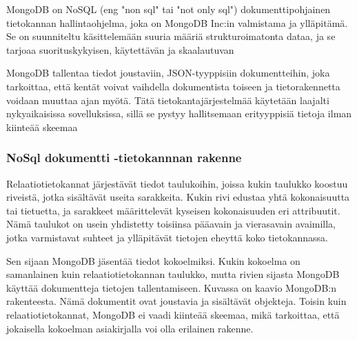 












MongoDB on NoSQL (eng "non sql"{} tai "not only sql"{}) dokumenttipohjainen tietokannan hallintaohjelma,
joka on MongoDB Inc:in valmistama ja ylläpitämä.
Se on suunniteltu käsittelemään suuria määriä strukturoimatonta dataa,
ja se tarjoaa suorituskykyisen, käytettävän ja skaalautuvan
\medskip




MongoDB tallentaa tiedot joustaviin, JSON-tyyppisiin dokumentteihin, 
joka tarkoittaa, että kentät voivat vaihdella dokumentista toiseen ja tietorakennetta voidaan muuttaa ajan myötä. 
Tätä tietokantajärjestelmää käytetään laajalti nykyaikaisissa sovelluksissa, 
sillä se pystyy hallitsemaan erityyppisiä tietoja ilman kiinteää skeemaa
\medskip



\subsubsection{NoSql dokumentti -tietokannnan rakenne}




Relaatiotietokannat järjestävät tiedot taulukoihin,
joissa kukin taulukko koostuu riveistä, jotka sisältävät useita sarakkeita.
Kukin rivi edustaa yhtä kokonaisuutta tai tietuetta, ja sarakkeet määrittelevät kyseisen kokonaisuuden eri attribuutit.
Nämä taulukot on usein yhdistetty toisiinsa pääavain ja vierasavain avaimilla,
jotka varmistavat suhteet ja ylläpitävät tietojen eheyttä koko tietokannassa.
\medskip

Sen sijaan MongoDB jäsentää tiedot kokoelmiksi.
Kukin kokoelma on samanlainen kuin relaatiotietokannan taulukko,
mutta rivien sijasta MongoDB käyttää dokumentteja tietojen tallentamiseen.
Kuvassa \nextImageCount{} on kaavio MongoDB:n rakenteesta. 
Nämä dokumentit ovat joustavia ja sisältävät objekteja.
Toisin kuin relaatiotietokannat, MongoDB ei vaadi kiinteää skeemaa, mikä tarkoittaa, 
että jokaisella kokoelman asiakirjalla voi olla erilainen rakenne.
\medskip

